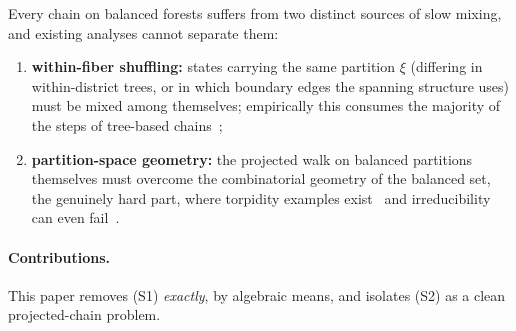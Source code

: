 \documentclass[11pt]{article}
\begin{document}
Every chain on balanced forests suffers from two distinct sources of slow
mixing, and existing analyses cannot separate them:
\begin{enumerate}[(S1)]
  \item \textbf{within-fiber shuffling:} states carrying the same partition
    $\xi$ (differing in within-district trees, or in which boundary edges the
    spanning structure uses) must be mixed among themselves; empirically this
    consumes the majority of the steps of tree-based
    chains~\cite{mew, deford2025cycle};
  \item \textbf{partition-space geometry:} the projected walk on balanced
    partitions themselves must overcome the combinatorial geometry of the
    balanced set, the genuinely hard part, where torpidity examples
    exist~\cite{charikar2023complexity} and irreducibility can even
    fail~\cite{akitaya2026bud}.
\end{enumerate}

\paragraph{Contributions.} This paper removes (S1) \emph{exactly}, by
algebraic means, and isolates (S2) as a clean projected-chain problem.
\end{document}
